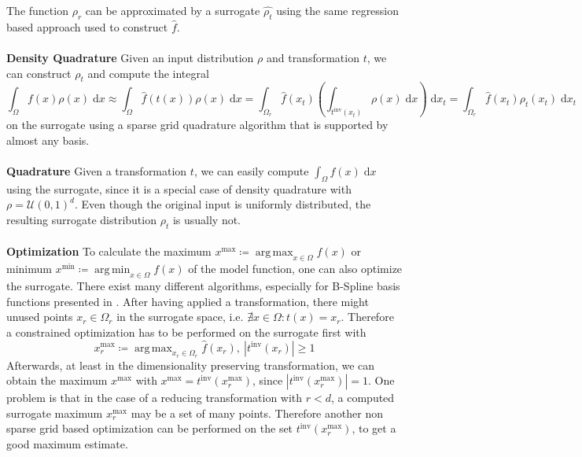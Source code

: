 \documentclass[
  a4paper,  %
  twoside,  %
  bibliography=totoc,
  headsepline,
  cleardoublepage=empty,
  parskip=half,
  draft=false
]{scrbook}
\DeclareMathOperator*{\argmin}{arg\,min}
\DeclareMathOperator*{\argmax}{arg\,max}
\begin{document}
The function $\rho_r$ can be approximated by a surrogate $\hat{\rho_t}$ using the same regression based approach used to construct $\hat{f}$.
\\
\\
\textbf{Density Quadrature}
Given an input distribution $\rho$ and transformation $t$, we can construct $\rho_t$ and compute the integral
\begin{equation}
\int_{\Omega} f(x) \rho(x) \; \text{d}x \approx \int_{\Omega} \hat{f}(t(x)) \rho(x) \; \text{d}x
=
\int_{\Omega_r} \hat{f}(x_t) \left(\int_{t^{\text{inv}}(x_t)} \rho(x)  \; \text{d}x \right)  \; \text{d}x_t=
\int_{\Omega_r} \hat{f}(x_t) \rho_t(x_t) \; \text{d}x_t
\end{equation}
on the surrogate using a sparse grid quadrature algorithm that is supported by almost any basis.
\\
\\
\textbf{Quadrature}
Given a transformation $t$, we can easily compute $\int_{\Omega} f(x) \; \text{d}x$ using the surrogate, since it is a special case of density quadrature with $\rho=\mathcal{U}(0,1)^d$.
Even though the original input is uniformly distributed, the resulting surrogate distribution $\rho_t$ is usually not.
\\
\\
\textbf{Optimization}
To calculate the maximum $x^\text{max} \coloneqq \argmax_{x \in \Omega} f(x)$ or minimum $x^\text{min} \coloneqq \argmin_{x \in \Omega} f(x)$ of the model function, one can also optimize the surrogate. There exist many different algorithms, especially for B-Spline basis functions presented in \cite{}.
After having applied a transformation, there might unused points $x_r \in \Omega_r$ in the surrogate space, i.e. $\nexists x \in \Omega \colon t(x)=x_r$.
Therefore a constrained optimization has to be performed on the surrogate first with
\begin{equation}
x_{r}^\text{max} \coloneqq \argmax_{x_r \in \Omega_r} \hat{f}(x_r), ~ |t^{\text{inv}}(x_{r})|\geq 1
\end{equation}
Afterwards, at least in the dimensionality preserving transformation, we can obtain the maximum $x^\text{max}$ with $x^\text{max}=t^{\text{inv}}(x_{r}^\text{max})$, since $|t^{\text{inv}}(x_{r}^\text{max})|=1$.
One problem is that in the case of a reducing transformation with $r<d$, a computed surrogate maximum $x_{r}^\text{max}$ may be a set of many points.
Therefore another non sparse grid based optimization can be performed on the set $t^{\text{inv}}(x_{r}^\text{max})$, to get a good maximum estimate.
\end{document}

